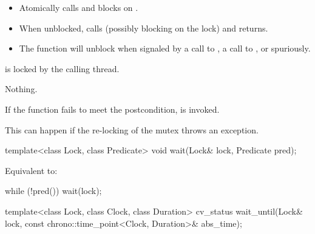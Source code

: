 \begin{itemdescr}
\pnum
{}%
\effects
\begin{itemize}
\item Atomically calls  and blocks on .
\item When unblocked, calls  (possibly blocking on the lock) and returns.
\item The function will unblock when signaled by a call to ,
a call to , or spuriously.
\end{itemize}

\pnum
\ensures
{} is locked by the calling thread.

\pnum
\throws
Nothing.

\pnum
\remarks
If the function fails to meet the postcondition, 
is invoked.
\begin{note}
This can happen if the re-locking of the mutex throws an exception.
\end{note}
\end{itemdescr}

%
\begin{itemdecl}
template<class Lock, class Predicate>
  void wait(Lock& lock, Predicate pred);
\end{itemdecl}

\begin{itemdescr}
\pnum
\effects
Equivalent to:
\begin{codeblock}
while (!pred())
  wait(lock);
\end{codeblock}
\end{itemdescr}

%
\begin{itemdecl}
template<class Lock, class Clock, class Duration>
  cv_status wait_until(Lock& lock, const chrono::time_point<Clock, Duration>& abs_time);
\end{itemdecl}

